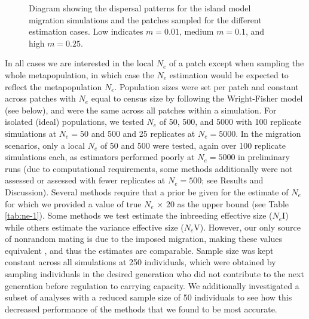 \begin{figure}[]
\centering
{}
\caption[~- Diagram showing the dispersal patterns for the simulated population demographies.]{Diagram showing the dispersal patterns for the island model migration simulations and the patches 
sampled for the different estimation cases. Low indicates $m = 0.01$, medium $m = 0.1$, and high $m = 0.25$.}
\label{fig:ne-1}
\end{figure}

In all cases we are interested in the local $N_e$ of a patch except when sampling 
the whole metapopulation, in which case the $N_e$ estimation would be expected to 
reflect the metapopulation $N_e$. Population sizes were set per patch and constant 
across patches with $N_e$ equal to census size by following the Wright-Fisher model 
(see below), and were the same across all patches within a simulation. For isolated (ideal) 
populations, we tested $N_e$ of 50, 500, and 5000 with 100 replicate simulations at 
$N_e = 50$ and 500 and 25 replicates at $N_e = 5000$. In the migration scenarios, 
only a local $N_e$ of 50 and 500 were tested, again over 100 replicate simulations each, 
as estimators performed poorly at $N_e = 5000$ in preliminary runs (due to computational 
requirements, some methods additionally were not assessed or assessed with fewer replicates at 
$N_e = 500$; see Results and Discussion). Several methods require that a prior be given 
for the estimate of $N_e$ for which we provided a value of true $N_e$ $\times$ 20 as 
the upper bound (see Table \ref{tab:ne-1}). Some methods we test estimate the inbreeding effective size 
($N_e$I) while others estimate the variance effective size ($N_e$V). However, 
our only source of nonrandom mating is due to the imposed migration, making these values 
equivalent \citep{Hill:1979}, and thus the estimates are comparable. Sample size was kept constant 
across all simulations at 250 individuals, which were obtained by sampling individuals in the 
desired generation who did not contribute to the next generation before regulation to carrying 
capacity. We additionally investigated a subset of analyses with a reduced sample size of 50 
individuals to see how this decreased performance of the methods that we found to be most accurate.

